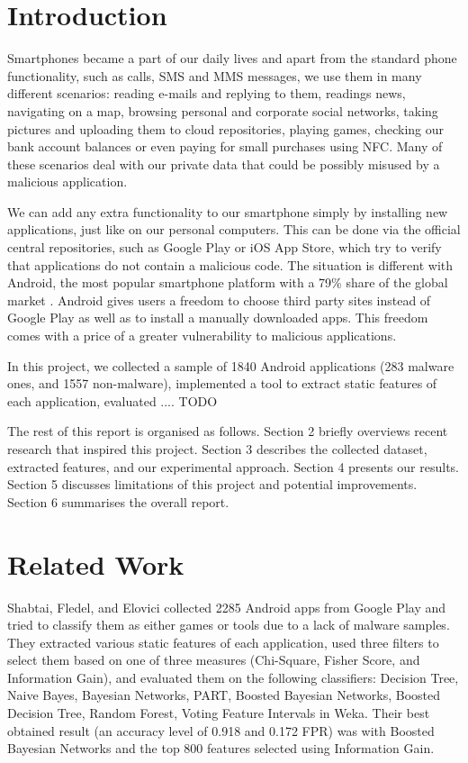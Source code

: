 \section{Introduction}
Smartphones became a part of our daily lives and apart from the standard phone functionality, such as calls, SMS and MMS messages, we use them in many different scenarios: reading e-mails and replying to them, readings news, navigating on a map, browsing personal and corporate social networks, taking pictures and uploading them to cloud repositories, playing games, checking our bank account balances or even paying for small purchases using NFC. Many of these scenarios deal with our private data that could be possibly misused by a malicious application.

We can add any extra functionality to our smartphone simply by installing new applications, just like on our personal computers. This can be done via the official central repositories, such as Google Play  \cite{google_play} or iOS App Store, which try to verify that applications do not contain a malicious code. The situation is different with Android, the most popular smartphone platform with a 79\% share of the global market \cite{idc}. Android gives users a freedom to choose third party sites instead of Google Play as well as to install a manually downloaded apps. This freedom comes with a price of a greater vulnerability to malicious applications.

In this project, we collected a sample of 1840 Android applications (283 malware ones, and 1557 non-malware), implemented a tool to extract static features of each application, evaluated .... TODO

The rest of this report is organised as follows. Section 2 briefly overviews recent research that inspired this project. Section 3 describes the collected dataset, extracted features, and our experimental approach. Section 4 presents our results. Section 5 discusses limitations of this project and potential improvements. Section 6 summarises the overall report.

\section{Related Work}
Shabtai, Fledel, and Elovici \cite{shabtai_2010} collected 2285 Android apps from Google Play and tried to classify them as either games or tools due to a lack of malware samples. They extracted various static features of each application, used three filters to select them based on one of three measures (Chi-Square, Fisher Score, and Information Gain), and evaluated them on the following classifiers: Decision Tree, Naive Bayes, Bayesian Networks, PART, Boosted Bayesian Networks, Boosted Decision Tree, Random Forest, Voting Feature Intervals in Weka. Their best obtained result (an accuracy level of 0.918 and 0.172 FPR) was with Boosted Bayesian Networks and the top 800 features selected using Information Gain.

